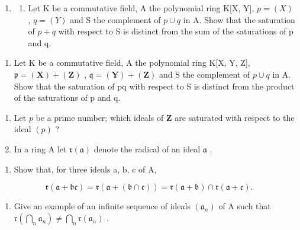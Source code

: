 \begin{enumerate}
\item
  \begin{enumerate}
  \def\labelenumii{(\alph{enumii})}
  \tightlist
  \item
    Let K be a commutative field, A the polynomial ring K{[}X, Y{]}, \(p = (X)\) , \(q = (Y)\) and S the complement of \(p \cup q\) in A. Show that the saturation of \(p + q\) with respect to S is distinct from the sum of the saturations of p and q.
  \end{enumerate}
\end{enumerate}

\begin{enumerate}
\def\labelenumi{(\alph{enumi})}
\setcounter{enumi}{1}
\tightlist
\item
  Let K be a commutative field, A the polynomial ring K{[}X, Y, Z{]}, \(\mathfrak{p} = (\mathbf{X}) + (\mathbf{Z})\) , \(\mathfrak{q} = (\mathbf{Y}) + (\mathbf{Z})\) and S the complement of \(p \cup q\) in A. Show that the saturation of pq with respect to S is distinct from the product of the saturations of p and q.
\end{enumerate}

\begin{enumerate}
\def\labelenumi{\arabic{enumi}.}
\setcounter{enumi}{10}
\item
  Let \(p\) be a prime number; which ideals of \(\mathbf{Z}\) are saturated with respect to the ideal \((p)\) ?
\item
  In a ring A let \(\mathfrak{r}(\mathfrak{a})\) denote the radical of an ideal \(\mathfrak{a}\) .
\end{enumerate}

\begin{enumerate}
\def\labelenumi{(\alph{enumi})}
\tightlist
\item
  Show that, for three ideals a, b, c of A,
\end{enumerate}

\[
\mathfrak {r} (\mathfrak {a} + \mathfrak {b c}) = \mathfrak {r} (\mathfrak {a} + (\mathfrak {b} \cap \mathfrak {c})) = \mathfrak {r} (\mathfrak {a} + \mathfrak {b}) \cap \mathfrak {r} (\mathfrak {a} + \mathfrak {c}).
\]

\begin{enumerate}
\def\labelenumi{(\alph{enumi})}
\setcounter{enumi}{1}
\tightlist
\item
  Give an example of an infinite sequence of ideals \((\mathfrak{a}_n)\) of A such that \(\mathfrak{r}\left(\bigcap_{n} \mathfrak{a}_n\right) \neq \bigcap_{n} \mathfrak{r}(\mathfrak{a}_n)\) .
\end{enumerate}

